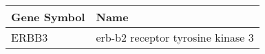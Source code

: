 \begin{tabular}{ll}
\toprule
Gene Symbol &                              Name \\
\midrule
      ERBB3 & erb-b2 receptor tyrosine kinase 3 \\
\bottomrule
\end{tabular}
